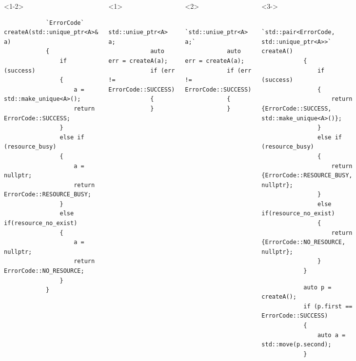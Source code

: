 \documentclass{beamer}
\begin{document}
\begin{frame}[fragile,t]
	\begin{columns}[T]
		\begin{onlyenv}
		\begin{lstlisting}
			`ErrorCode` createA(std::unique_ptr<A>& a)
			{
				if (success)
				{
					a = std::make_unique<A>();
					return ErrorCode::SUCCESS;
				}
				else if (resource_busy)
				{
					a = nullptr;
					return ErrorCode::RESOURCE_BUSY;
				}
				else if(resource_no_exist)
				{
					a = nullptr;
					return ErrorCode::NO_RESOURCE;
				}
			}
		\end{lstlisting}
		\end{onlyenv}
		
        \hrulefill
		\begin{onlyenv}<1>
		\begin{lstlisting}
			std::uniue_ptr<A> a;
			auto err = createA(a);
			if (err != ErrorCode::SUCCESS)
			{
			}
		\end{lstlisting}
		\end{onlyenv}
		
		\begin{onlyenv}<2>
		\begin{lstlisting}
			`std::uniue_ptr<A> a;`
			auto err = createA(a);
			if (err != ErrorCode::SUCCESS)
			{
			}
		\end{lstlisting}
		\end{onlyenv}
		
		
		\begin{onlyenv}		
		\begin{lstlisting}
			`std::pair<ErrorCode, std::unique_ptr<A>>` createA()
			{
				if (success)
				{
					return {ErrorCode::SUCCESS, std::make_unique<A>()};
				}
				else if (resource_busy)
				{
					return {ErrorCode::RESOURCE_BUSY, nullptr};
				}
				else if(resource_no_exist)
				{
					return {ErrorCode::NO_RESOURCE, nullptr};
				}
			}
		\end{lstlisting}
			
        \hrulefill
		\begin{lstlisting}
			auto p = createA();
			if (p.first == ErrorCode::SUCCESS)
			{
				auto a = std::move(p.second);
			}
		\end{lstlisting}


\end{onlyenv}
\end{columns}
\end{frame}
\end{document}

